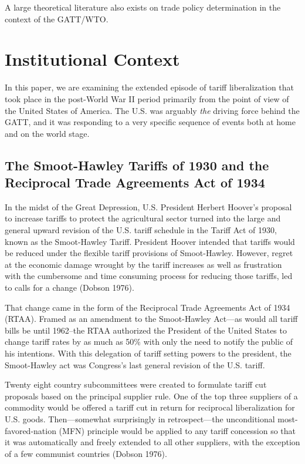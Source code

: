 \documentclass[
  12pt,
]{article}
\begin{document}
A large theoretical literature also exists on trade policy determination in the context of the GATT/WTO.

\hypertarget{institutional-context}{%
\section{Institutional Context}\label{institutional-context}}

In this paper, we are examining the extended episode of tariff liberalization that took place in the post-World War II period primarily from the point of view of the United States of America. The U.S. was arguably \emph{the} driving force behind the GATT, and it was responding to a very specific sequence of events both at home and on the world stage.

\hypertarget{the-smoot-hawley-tariffs-of-1930-and-the-reciprocal-trade-agreements-act-of-1934}{%
\subsection{The Smoot-Hawley Tariffs of 1930 and the Reciprocal Trade Agreements Act of 1934}\label{the-smoot-hawley-tariffs-of-1930-and-the-reciprocal-trade-agreements-act-of-1934}}

In the midst of the Great Depression, U.S. President Herbert Hoover's proposal to increase tariffs to protect the agricultural sector turned into the large and general upward revision of the U.S. tariff schedule in the Tariff Act of 1930, known as the Smoot-Hawley Tariff. President Hoover intended that tariffs would be reduced under the flexible tariff provisions of Smoot-Hawley. However, regret at the economic damage wrought by the tariff increases as well as frustration with the cumbersome and time consuming process for reducing those tariffs, led to calls for a change (Dobson 1976).

That change came in the form of the Reciprocal Trade Agreements Act of 1934 (RTAA). Framed as an amendment to the Smoot-Hawley Act---as would all tariff bills be until 1962--the RTAA authorized the President of the United States to change tariff rates by as much as 50\% with only the need to notify the public of his intentions. With this delegation of tariff setting powers to the president, the Smoot-Hawley act was Congress's last general revision of the U.S. tariff.

Twenty eight country subcommittees were created to formulate tariff cut proposals based on the principal supplier rule. One of the top three suppliers of a commodity would be offered a tariff cut in return for reciprocal liberalization for U.S. goods. Then---somewhat surprisingly in retrospect---the unconditional most-favored-nation (MFN) principle would be applied to any tariff concession so that it was automatically and freely extended to all other suppliers, with the exception of a few communist countries (Dobson 1976).
\end{document}
